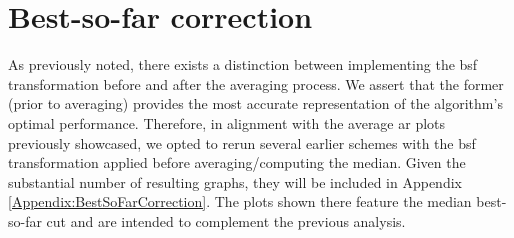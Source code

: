 
\clearpage %



\section{Best-so-far correction}
\label{section:BSF_correction}




As previously noted, there exists a distinction between implementing the \acrshort{bsf} transformation before and after the averaging process. We assert that the former (prior to averaging) provides the most accurate representation of the algorithm's optimal performance. Therefore, in alignment with the average \acrshort{ar} plots previously showcased, we opted to rerun several earlier schemes with the \acrshort{bsf} transformation applied before averaging/computing the median. Given the substantial number of resulting graphs, they will be included in Appendix \ref{Appendix:BestSoFarCorrection}. The plots shown there feature the median best-so-far cut and are intended to complement the previous analysis.

